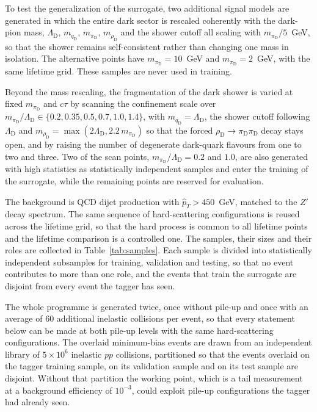 \documentclass[a4paper,11pt]{article}
\newcommand{\ctau}{c\tau}
\newcommand{\pid}{\pi_{\mathrm{D}}}
\newcommand{\rhod}{\rho_{\mathrm{D}}}
\newcommand{\qD}{q_{\mathrm{D}}}
\newcommand{\mpid}{m_{\pid}}
\begin{document}
To test the generalization of the surrogate, two additional signal
models are generated in which the entire dark sector is rescaled
coherently with the dark-pion mass, $\Lambda_{\mathrm{D}}$, $m_{\qD}$,
$\mpid$, $m_{\rhod}$ and the shower cutoff all scaling with
$\mpid/5$~GeV, so that the shower remains self-consistent rather than
changing one mass in isolation. The alternative points have
$\mpid = 10$~GeV and $\mpid = 2$~GeV, with the same lifetime grid.
These samples are never used in training.

Beyond the mass rescaling, the fragmentation of the dark shower is
varied at fixed $\mpid$ and $\ctau$ by scanning the confinement scale
over $\mpid/\Lambda_{\mathrm{D}} \in \{0.2, 0.35, 0.5, 0.7, 1.0,
1.4\}$, with $m_{\qD} = \Lambda_{\mathrm{D}}$, the shower cutoff
following $\Lambda_{\mathrm{D}}$ and
$m_{\rhod} = \max(2\Lambda_{\mathrm{D}}, 2.2\,\mpid)$ so that the
forced $\rhod \to \pid\pid$ decay stays open, and by raising the
number of degenerate dark-quark flavours from one to two and three.
Two of the scan points, $\mpid/\Lambda_{\mathrm{D}} = 0.2$ and $1.0$,
are also generated with high statistics as statistically independent
samples and enter the training of the surrogate, while the remaining
points are reserved for evaluation.

The background is QCD dijet production with $\hat p_T > 450$~GeV,
matched to the $Z'$ decay spectrum. The same sequence of
hard-scattering configurations is reused across the lifetime grid, so
that the hard process is common to all lifetime points and the
lifetime comparison is a controlled one. The samples, their sizes and
their roles are collected in Table~\ref{tab:samples}. Each sample is
divided into statistically independent subsamples for training,
validation and testing, so that no event contributes to more than one
role, and the events that train the surrogate are disjoint from every
event the tagger has seen.

The whole programme is generated twice, once without pile-up and once
with an average of $60$ additional inelastic collisions per event, so
that every statement below can be made at both pile-up levels with the
same hard-scattering configurations. The overlaid minimum-bias events
are drawn from an independent library of $5\times10^{6}$ inelastic
$pp$ collisions, partitioned so that the events overlaid on the tagger
training sample, on its validation sample and on its test sample are
disjoint. Without that partition the working point, which is a tail
measurement at a background efficiency of $10^{-3}$, could exploit
pile-up configurations the tagger had already seen.
\end{document}
